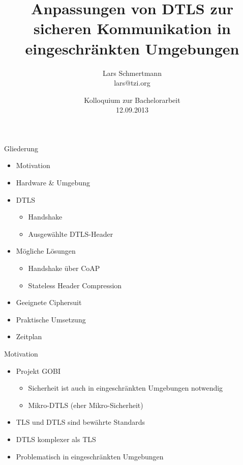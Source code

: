 \documentclass{beamer}
\title[Anpassungen von DTLS]%
{%
  Anpassungen von DTLS zur sicheren Kommunikation in eingeschränkten Umgebungen
}
\author[Lars Schmertmann]%
{
{Lars Schmertmann}\\
\vspace{.2cm}
{\scriptsize lars@tzi.org}
}
\institute{TZI, Universit\"{a}t Bremen, Deutschland}
\date[09.2013]%
{{Kolloquium zur Bachelorarbeit\\
12.09.2013}}%
\begin{document}

\begin{frame}
  \titlepage
\end{frame}

\begin{frame}{Gliederung}
  \begin{itemize}
    \item Motivation
    \item Hardware \& Umgebung
    \item DTLS
      \begin{itemize}
        \item Handshake
        \item Ausgewählte DTLS-Header
      \end{itemize}
    \item Mögliche Lösungen
    \begin{itemize}
      \item Handshake über CoAP
      \item Stateless Header Compression
    \end{itemize}
    \item Geeignete Ciphersuit
    \item Praktische Umsetzung
    \item Zeitplan
  \end{itemize}
\end{frame}

\begin{frame}{Motivation}
  \begin{itemize}
    \item Projekt GOBI
    \begin{itemize}
      \item Sicherheit ist auch in eingeschränkten \newline Umgebungen notwendig
      \item Mikro-DTLS (eher Mikro-Sicherheit)
    \end{itemize}
    \item TLS und DTLS sind bewährte Standards
    \item DTLS komplexer als TLS
    \item Problematisch in eingeschränkten Umgebungen
  \end{itemize}
\end{frame}
\end{document}
